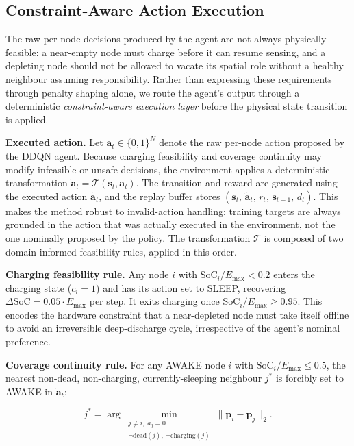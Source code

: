 \documentclass[journal]{IEEEtran}
\begin{document}
\subsection{Constraint-Aware Action Execution}
\label{sec:exec_layer}

The raw per-node decisions produced by the agent are not always
physically feasible: a near-empty node must charge before it can resume
sensing, and a depleting node should not be allowed to vacate its
spatial role without a healthy neighbour assuming responsibility.
Rather than expressing these requirements through penalty shaping
alone, we route the agent's output through a deterministic
\textit{constraint-aware execution layer} before the physical state
transition is applied.

\textbf{Executed action.} Let $\mathbf{a}_t \in \{0,1\}^N$ denote the
raw per-node action proposed by the DDQN agent. Because charging
feasibility and coverage continuity may modify infeasible or unsafe
decisions, the environment applies a deterministic transformation
$\tilde{\mathbf{a}}_t = \mathcal{T}(\mathbf{s}_t, \mathbf{a}_t)$. The
transition and reward are generated using the executed action
$\tilde{\mathbf{a}}_t$, and the replay buffer stores
$(\mathbf{s}_t,\, \tilde{\mathbf{a}}_t,\, r_t,\, \mathbf{s}_{t+1},\,
d_t)$. This makes the method robust to invalid-action handling:
training targets are always grounded in the action that was actually
executed in the environment, not the one nominally proposed by the
policy. The transformation $\mathcal{T}$ is composed of two
domain-informed feasibility rules, applied in this order.

\textbf{Charging feasibility rule.} Any node $i$ with
$\text{SoC}_i / E_{\max} < 0.2$ enters the charging state ($c_i = 1$)
and has its action set to SLEEP, recovering
$\Delta\text{SoC} = 0.05 \cdot E_{\max}$ per step. It exits charging
once $\text{SoC}_i / E_{\max} \geq 0.95$. This encodes the hardware
constraint that a near-depleted node must take itself offline to avoid
an irreversible deep-discharge cycle, irrespective of the agent's
nominal preference.

\textbf{Coverage continuity rule.} For any AWAKE node $i$ with
$\text{SoC}_i / E_{\max} \leq 0.5$, the nearest non-dead, non-charging,
currently-sleeping neighbour $j^*$ is forcibly set to AWAKE in
$\tilde{\mathbf{a}}_t$:

\begin{equation}
  j^* = \arg\min_{\substack{j \neq i,\; a_j = 0 \\
                             \neg\text{dead}(j),\;
                             \neg\text{charging}(j)}}
         \|\mathbf{p}_i - \mathbf{p}_j\|_2.
  \label{eq:coop}
\end{equation}
\end{document}
